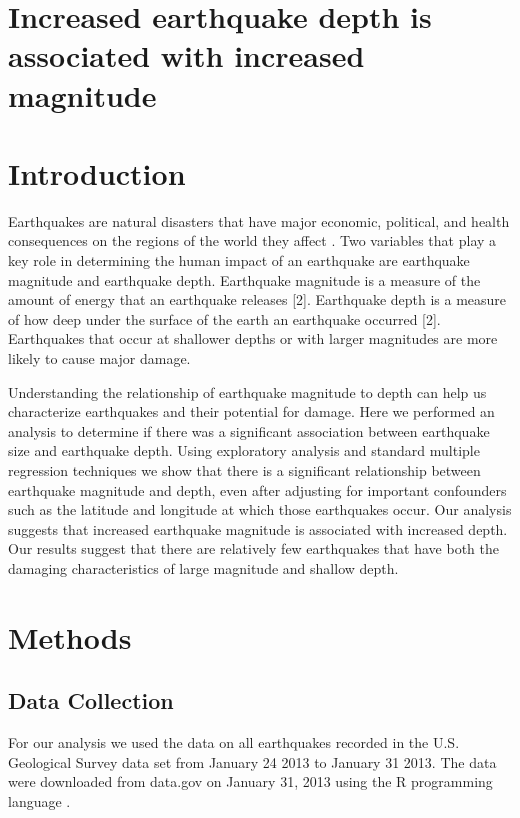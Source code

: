 \documentclass[a4paper,14pt]{extarticle}
\begin{document}
\section*{Increased earthquake depth is associated with increased magnitude}

\section{Introduction}

Earthquakes are natural disasters that have major economic, political, and health consequences on the regions of the world they affect \cite{wikiearthquake}. Two variables that play a key role in determining the human impact of an earthquake are earthquake magnitude and earthquake depth. Earthquake magnitude is a measure of the amount of energy that an earthquake releases [2]. Earthquake depth is a measure of how deep under the surface of the earth an earthquake occurred [2]. Earthquakes that occur at shallower depths or with larger magnitudes are more likely to cause major damage.

Understanding the relationship of earthquake magnitude to depth can help us characterize earthquakes and their potential for damage. Here we performed an analysis to determine if there was a significant association between earthquake size and earthquake depth. Using exploratory analysis and standard multiple regression techniques we show that there is a significant relationship between earthquake magnitude and depth, even after adjusting for important confounders such as the latitude and longitude at which those earthquakes occur. Our analysis suggests that increased earthquake magnitude is associated with increased depth. Our results suggest that there are relatively few earthquakes that have both the damaging characteristics of large magnitude and shallow depth.


\section{Methods}

\subsection{Data Collection}

For our analysis we used the data on all earthquakes recorded in the U.S. Geological Survey data set from January 24 2013 to January 31 2013. The data were downloaded from data.gov on January 31, 2013 using the R programming language \cite{r-language}.
\end{document}

